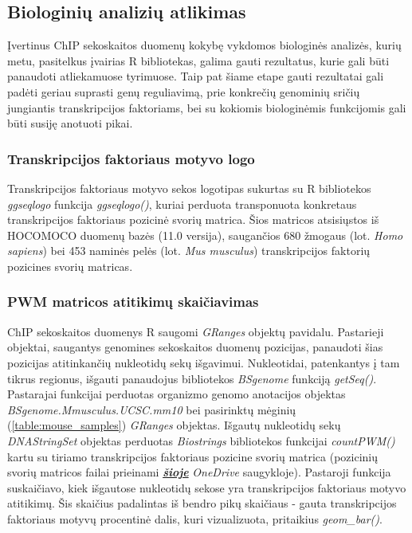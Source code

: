 \documentclass[12pt]{article}
\begin{document}
\newpage

\subsection{Biologinių analizių atlikimas}
Įvertinus ChIP sekoskaitos duomenų kokybę vykdomos biologinės analizės,
kurių metu, pasitelkus įvairias R bibliotekas, galima gauti rezultatus, kurie
gali būti panaudoti atliekamuose tyrimuose. Taip pat šiame etape gauti
rezultatai gali padėti geriau suprasti genų reguliavimą, prie konkrečių
genominių sričių jungiantis transkripcijos faktoriams, bei su kokiomis
biologinėmis funkcijomis gali būti susiję anotuoti pikai.

\subsubsection*{Transkripcijos faktoriaus motyvo logo}
Transkripcijos faktoriaus motyvo sekos logotipas sukurtas su R bibliotekos
\emph{ggseqlogo} \cite{GGSEQLOGO} funkcija \emph{ggseqlogo()}, kuriai perduota
transponuota konkretaus transkripcijos faktoriaus pozicinė svorių matrica.
Šios matricos atsisiųstos iš HOCOMOCO \cite{HOCOMOCO} duomenų bazės (11.0
versija), saugančios 680 žmogaus (lot. \emph{Homo sapiens}) bei 453 naminės
pelės (lot. \emph{Mus musculus}) transkripcijos faktorių pozicines svorių
matricas.

\subsubsection*{PWM matricos atitikimų skaičiavimas}
ChIP sekoskaitos duomenys R saugomi \emph{GRanges} objektų pavidalu.
Pastarieji objektai, saugantys genomines sekoskaitos duomenų pozicijas,
panaudoti šias pozicijas atitinkančių nukleotidų sekų išgavimui. Nukleotidai,
patenkantys į tam tikrus regionus, išgauti panaudojus bibliotekos
\emph{BSgenome} \cite{BSGENOME} funkciją \emph{getSeq()}. Pastarajai funkcijai
perduotas organizmo genomo anotacijos objektas
\emph{BSgenome.Mmusculus.UCSC.mm10} \cite{BSMUSMUSCULUS} bei pasirinktų
mėginių (\ref{table:mouse_samples}) \emph{GRanges} objektas. Išgautų nukleotidų
sekų \emph{DNAStringSet} objektas perduotas \emph{Biostrings} \cite{BIOSTRINGS} 
bibliotekos funkcijai \emph{countPWM()} kartu su tiriamo transkripcijos
faktoriaus pozicine svorių matrica (pozicinių svorių matricos failai prieinami
\href{https://vult-my.sharepoint.com/:f:/g/personal/daniele_stasiunaite_mif_stud_vu_lt/EtEGQ8POkapLhPv6eHvl48cB-jmes81M0JPW8PVWTz2QgA?e=wjSSKJ}{\textbf{\emph{šioje}}}
\emph{OneDrive} saugykloje).
Pastaroji funkcija suskaičiavo, kiek išgautose nukleotidų sekose yra
transkripcijos faktoriaus motyvo atitikimų. Šis skaičius padalintas iš bendro
pikų skaičiaus - gauta transkripcijos faktoriaus motyvų procentinė dalis, kuri
vizualizuota, pritaikius \emph{geom\_bar()}.
\end{document}
